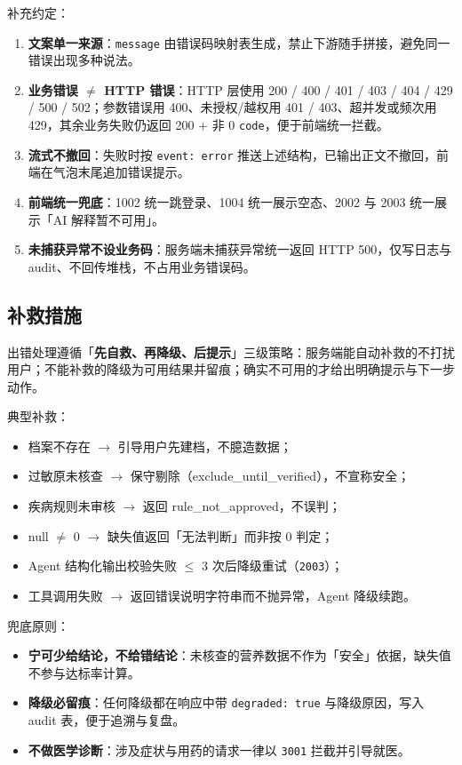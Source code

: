 \documentclass[12pt,a4paper]{ctexart}
\begin{document}
补充约定：

\begin{enumerate}
\item \textbf{文案单一来源}：\texttt{message} 由错误码映射表生成，禁止下游随手拼接，避免同一错误出现多种说法。
\item \textbf{业务错误 $\neq$ HTTP 错误}：HTTP 层使用 200 / 400 / 401 / 403 / 404 / 429 / 500 / 502；参数错误用 400、未授权/越权用 401 / 403、超并发或频次用 429，其余业务失败仍返回 200 + 非 0 \texttt{code}，便于前端统一拦截。
\item \textbf{流式不撤回}：失败时按 \texttt{event: error} 推送上述结构，已输出正文不撤回，前端在气泡末尾追加错误提示。
\item \textbf{前端统一兜底}：1002 统一跳登录、1004 统一展示空态、2002 与 2003 统一展示「AI 解释暂不可用」。
\item \textbf{未捕获异常不设业务码}：服务端未捕获异常统一返回 HTTP 500，仅写日志与 audit、不回传堆栈，不占用业务错误码。
\end{enumerate}

\subsection{补救措施}

出错处理遵循「\textbf{先自救、再降级、后提示}」三级策略：服务端能自动补救的不打扰用户；不能补救的降级为可用结果并留痕；确实不可用的才给出明确提示与下一步动作。

典型补救：

\begin{itemize}
\item 档案不存在 $\rightarrow$ 引导用户先建档，不臆造数据；
\item 过敏原未核查 $\rightarrow$ 保守剔除（exclude\_until\_verified），不宣称安全；
\item 疾病规则未审核 $\rightarrow$ 返回 rule\_not\_approved，不误判；
\item null $\neq$ 0 $\rightarrow$ 缺失值返回「无法判断」而非按 0 判定；
\item Agent 结构化输出校验失败 $\le$ 3 次后降级重试（\texttt{2003}）；
\item 工具调用失败 $\rightarrow$ 返回错误说明字符串而不抛异常，Agent 降级续跑。
\end{itemize}

兜底原则：

\begin{itemize}
\item \textbf{宁可少给结论，不给错结论}：未核查的营养数据不作为「安全」依据，缺失值不参与达标率计算。
\item \textbf{降级必留痕}：任何降级都在响应中带 \texttt{degraded: true} 与降级原因，写入 audit 表，便于追溯与复盘。
\item \textbf{不做医学诊断}：涉及症状与用药的请求一律以 \texttt{3001} 拦截并引导就医。
\end{itemize}
\end{document}
